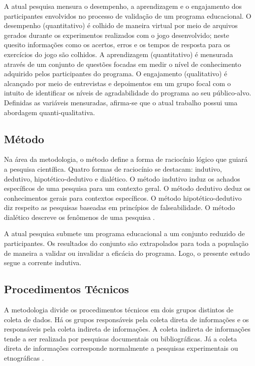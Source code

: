A atual pesquisa mensura o desempenho, a aprendizagem e o engajamento dos participantes envolvidos no processo de validação de um programa educacional. O desempenho (quantitativo) é colhido de maneira virtual por meio de arquivos gerados durante os experimentos realizados com o jogo desenvolvido; neste quesito informações como os acertos, erros e os tempos de resposta para os exercícios do jogo são colhidos. A aprendizagem (quantitativo) é mensurada através de um conjunto de questões focadas em medir o nível de conhecimento adquirido pelos participantes do programa. O engajamento (qualitativo) é alcançado por meio de entrevistas e depoimentos em um grupo focal com o intuito de identificar os níveis de agradabilidade do programa ao seu público-alvo. Definidas as variáveis mensuradas, afirma-se que o atual trabalho possui uma abordagem quanti-qualitativa. 

\subsection{Método}\label{sub:Metodo}

Na área da metodologia, o método define a forma de raciocínio lógico que guiará a pesquisa científica. Quatro formas de raciocínio se destacam: indutivo, dedutivo, hipotético-dedutivo e dialético. O método indutivo induz os achados específicos de uma pesquisa para um contexto geral. O método dedutivo deduz os conhecimentos gerais para contextos específicos. O método hipotético-dedutivo diz respeito as pesquisas baseadas em princípios de falseabilidade. O método dialético descreve os fenômenos de uma pesquisa \cite{marconi2003lakatos}.  

A atual pesquisa submete um programa educacional a um conjunto reduzido de participantes. Os resultados do conjunto são extrapolados para toda a população de maneira a validar ou invalidar a eficácia do programa. Logo, o presente estudo segue a corrente indutiva. 

\subsection{Procedimentos Técnicos}\label{sub:Procedimentos}

A metodologia divide os procedimentos técnicos em dois grupos distintos de coleta de dados. Há os grupos responsáveis pela coleta direta de informações e os responsáveis pela coleta indireta de informações. A coleta indireta de informações tende a ser realizada por pesquisas documentais ou bibliográficas. Já a coleta direta de informações corresponde normalmente a pesquisas experimentais ou etnográficas \cite{cordova2009pesquisa}. 

